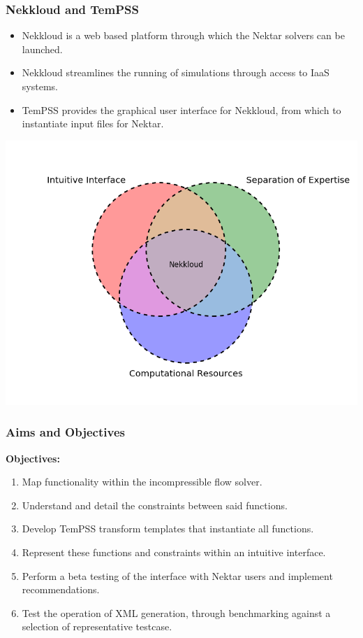 \documentclass{beamer}
\begin{document}
\begin{frame}\frametitle{Nekkloud and TemPSS}
\begin{itemize}
\item  Nekkloud is a web based platform through which the Nektar solvers can be launched.
\item Nekkloud streamlines the running of simulations through access to IaaS systems.
\item TemPSS provides the graphical user interface for Nekkloud, from which to instantiate input files for Nektar.
\end{itemize}
\centering
\vspace{3pt}
\includegraphics[width=.75\linewidth,  clip=true, trim = 0cm 0cm 0cm 2cm]{venn_diagram}
\end{frame}


\begin{frame}\frametitle{Aims and Objectives}

\textbf{Objectives:}
\begin{enumerate}
\item Map functionality within the incompressible flow solver.
\item Understand and detail the constraints between said functions.
\item Develop TemPSS transform templates that instantiate all functions.
\item Represent these functions and constraints within an intuitive interface.
\item Perform a beta testing of the interface with Nektar users and implement recommendations.
\item Test the operation of XML generation, through benchmarking against a selection of representative testcase.
\end{enumerate}
\end{frame}
\end{document}
